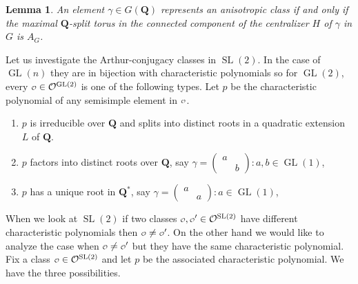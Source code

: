 \documentclass[11pt]{amsart}
\def\Q{\mathbf Q}
\def\O{\mathcal O}
\def\o{\scalebox{0.8}{$\scriptstyle\mathcal{O}$}}
\def\gl{\operatorname{GL}}
\def\sl{\operatorname{SL}}
\newtheorem{lemma}[theorem]{Lemma}
\theoremstyle{remark}
\begin{document}
\begin{lemma}
	An element $\gamma \in G(\Q)$ represents an anisotropic class if and only if the maximal $\Q$-split torus in the connected component of the centralizer $H$ of $\gamma$ in $G$ is $A_G$. 
\end{lemma}

Let us investigate the Arthur-conjugacy classes in $\sl(2)$. In the case of $\gl(n)$ they are in bijection with characteristic polynomials so for $\gl(2)$, every $\o \in \O^{\gl(2)}$ is one of the following types. Let $p$ be the characteristic polynomial of any semisimple element in $\o$. 
\begin{enumerate}
	\item $p$ is irreducible over $\Q$ and splits into distinct roots in a quadratic extension $L$ of $\Q$.
	\item $p$ factors into distinct roots over $\Q$, say $\gamma = \begin{pmatrix} a & \\ & b \end{pmatrix}: 
			a, b \in \gl(1)$,
	\item $p$ has a unique root in $\Q^*$, say $\gamma = \begin{pmatrix} a & \\ & a \end{pmatrix}: a \in \gl(1)$,
\end{enumerate}
When we look at $\sl(2)$ if two classes $\o, \o' \in \O^{\sl(2)}$ have different characteristic polynomials then $\o \neq \o'$. On the other hand we would like to analyze the case when $\o \neq \o'$ but they have the same characteristic polynomial. Fix a class $\o \in \O^{\sl(2)}$ and let $p$ be the associated characteristic polynomial. We have the three possibilities. 
\end{document}
